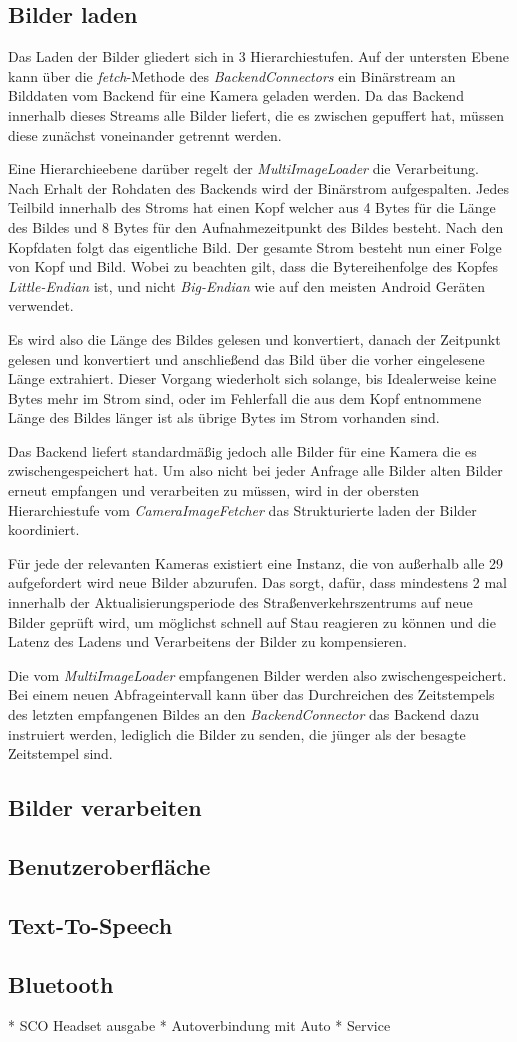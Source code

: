 \subsection{Bilder laden}
Das Laden der Bilder gliedert sich in 3 Hierarchiestufen.
Auf der untersten Ebene kann über die {\em fetch}-Methode des {\em BackendConnectors} ein Binärstream an Bilddaten vom Backend für eine Kamera geladen werden.
Da das Backend innerhalb dieses Streams alle Bilder liefert, die es zwischen gepuffert hat, müssen diese zunächst voneinander getrennt werden.

Eine Hierarchieebene darüber regelt der {\em MultiImageLoader} die Verarbeitung.
Nach Erhalt der Rohdaten des Backends wird der Binärstrom aufgespalten.
Jedes Teilbild innerhalb des Stroms hat einen Kopf welcher aus 4 Bytes für die Länge des Bildes und 8 Bytes für den Aufnahmezeitpunkt des Bildes besteht.
Nach den Kopfdaten folgt das eigentliche Bild. Der gesamte Strom besteht nun einer Folge von Kopf und Bild. Wobei zu beachten gilt, dass die Bytereihenfolge des Kopfes {\em Little-Endian} ist, und nicht {\em Big-Endian} wie auf den meisten Android Geräten verwendet.

Es wird also die Länge des Bildes gelesen und konvertiert, danach der Zeitpunkt gelesen und konvertiert und anschließend das Bild über die vorher eingelesene Länge extrahiert. Dieser Vorgang wiederholt sich solange, bis Idealerweise keine Bytes mehr im Strom sind, oder im Fehlerfall die aus dem Kopf entnommene Länge des Bildes länger ist als übrige Bytes im Strom vorhanden sind.

Das Backend liefert standardmäßig jedoch alle Bilder für eine Kamera die es zwischengespeichert hat. Um also nicht bei jeder Anfrage alle Bilder alten Bilder erneut empfangen und verarbeiten zu müssen, wird in der obersten Hierarchiestufe vom {\em CameraImageFetcher} das Strukturierte laden der Bilder koordiniert.

Für jede der relevanten Kameras existiert eine Instanz, die von außerhalb alle 29 aufgefordert wird neue Bilder abzurufen. Das sorgt, dafür, dass mindestens 2 mal innerhalb der Aktualisierungsperiode des Straßenverkehrszentrums auf neue Bilder geprüft wird, um möglichst schnell auf Stau reagieren zu können und die Latenz des Ladens und Verarbeitens der Bilder zu kompensieren.

Die vom {\em MultiImageLoader} empfangenen Bilder werden also zwischengespeichert. Bei einem neuen Abfrageintervall kann über das Durchreichen des Zeitstempels des letzten empfangenen Bildes an den {\em BackendConnector} das Backend dazu instruiert werden, lediglich die Bilder zu senden, die jünger als der besagte Zeitstempel sind.

\subsection{Bilder verarbeiten}
\subsection{Benutzeroberfläche}
\subsection{Text-To-Speech}
\subsection{Bluetooth}
* SCO Headset ausgabe
* Autoverbindung mit Auto
* Service 